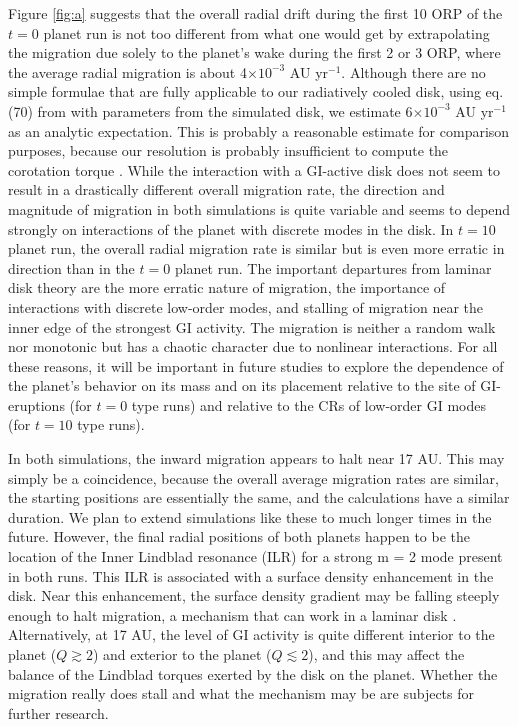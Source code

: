 \documentclass[12pt,manuscript,authoryear]{aastex}
\begin{document}
Figure \ref{fig:a} suggests that the overall radial drift during the first 10 ORP of the $t = 0$ planet run is not too different from what one would get by extrapolating the migration due solely to the planet's wake during the first 2 or 3 ORP, where the average radial migration is about 4$\times10^{-3}$ AU yr$^{-1}$. Although there are no simple formulae that are fully applicable to our radiatively cooled disk, using eq. (70) from \citet{tanaka2002} with parameters from the simulated disk, we estimate 6$\times10^{-3}$ AU yr$^{-1}$ as an analytic expectation. This is probably a reasonable estimate for comparison purposes, because our resolution is probably insufficient to compute the corotation torque \citep{paardekooper2010}. 
While the interaction with a GI-active disk does not seem to result in a drastically different overall migration rate, the direction and magnitude of migration in both simulations is quite variable and seems to depend strongly on interactions of the planet with discrete modes in the disk. In $t = 10$ planet run, the overall radial migration rate is similar but is even more erratic in direction than in the $t = 0$ planet run. The important departures from laminar disk theory are the more erratic nature of migration, the importance of interactions with discrete low-order modes, and stalling of migration near the inner edge of the strongest GI activity. The migration is neither a random walk nor monotonic but has a chaotic character due to nonlinear interactions. For all these reasons, it will be important in future studies to explore the dependence of the planet's behavior on its mass and on its placement relative to the site of GI-eruptions (for $t = 0$ type runs) and relative to the CRs of low-order GI modes (for $t = 10$ type runs).

In both simulations, the inward migration appears to halt near 17 AU. This may simply be a coincidence, because the overall average migration rates are similar, the starting positions are essentially the same, and the calculations have a similar duration. We plan to extend simulations like these to much longer times in the future. However, the final radial positions of both planets happen to be the location of the Inner Lindblad resonance (ILR) for a strong m = 2 mode present in both runs. This ILR is associated with a surface density enhancement in the disk. Near this enhancement, the surface density gradient may be falling steeply enough to halt migration, a mechanism that can work in a laminar disk \citep[note the $\alpha$ dependence in eq. (70) of][]{tanaka2002}. 
Alternatively, at 17 AU, the level of GI activity is quite different interior to the planet ($Q \gtrsim 2$) and exterior to the planet ($Q \lesssim 2$), and this may affect the balance of the Lindblad torques exerted by the disk on the planet. Whether the migration really does stall and what the mechanism may be are subjects for further research.
\end{document}
